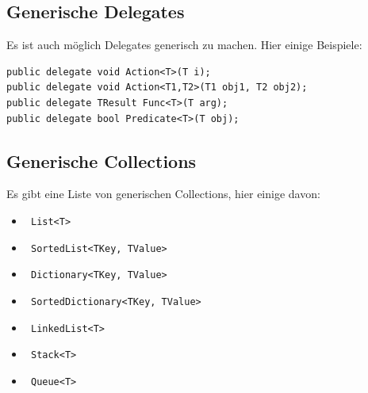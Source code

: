 \documentclass[
a4paper,
oneside,
10pt,
fleqn,
headsepline,
toc=listofnumbered, 
bibliography=totocnumbered]{scrartcl}
\begin{document}
\subsection{Generische Delegates}
Es ist auch möglich Delegates generisch zu machen. Hier einige Beispiele:
\begin{lstlisting}
public delegate void Action<T>(T i); 
public delegate void Action<T1,T2>(T1 obj1, T2 obj2); 
public delegate TResult Func<T>(T arg); 
public delegate bool Predicate<T>(T obj); 
\end{lstlisting}

\subsection{Generische Collections}
Es gibt eine Liste von generischen Collections, hier einige davon:

\begin{itemize}
    \item \lstinline| List<T> |
    \item \lstinline| SortedList<TKey, TValue> |
    \item \lstinline| Dictionary<TKey, TValue> |
    \item \lstinline| SortedDictionary<TKey, TValue> |
    \item \lstinline| LinkedList<T> |
    \item \lstinline| Stack<T>| 
    \item \lstinline| Queue<T>|
\end{itemize}
\end{document}
